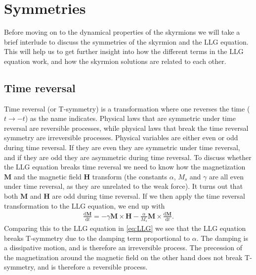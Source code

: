 \section{Symmetries}
Before moving on to the dynamical properties of the skyrmions we will take a brief interlude to discuss the symmetries of the skyrmion and the LLG equation. This will help us to get further insight into how the different terms in the LLG equation work, and how the skyrmion solutions are related to each other.
\subsection{Time reversal}
Time reversal (or T-symmetry) is a transformation where one reverses the time ($t \rightarrow -t$) as the name indicates. Physical laws that are symmetric under time reversal are reversible processes, while physical laws that break the time reversal symmetry are irreversible processes. Physical variables are either even or odd during time reversal. If they are even they are symmetric under time reversal, and if they are odd they are asymmetric during time reversal. To discuss whether the LLG equation breaks time reversal we need to know how the magnetization $\mathbold{M}$ and the magnetic field $\mathbold{H}$ transform (the constants $\alpha$, $M_s$ and $\gamma$ are all even under time reversal, as they are unrelated to the weak force). It turns out that both $\mathbold{M}$ and $\mathbold{H}$ are odd during time reversal. If we then apply the time reversal transformation to the LLG equation, we end up with
\begin{align}
\label{eq:LLG_TR}
\frac{\textrm{d}\mathbold{M}}{\textrm{d}t} = -\gamma\mathbold{M}\times\mathbold{H}-\frac{\alpha}{M_s}\mathbold{M}\times\frac{\textrm{d}\mathbold{M}}{\textrm{d}t}.
\end{align}
Comparing this to the LLG equation in \eqref{eq:LLG} we see that the LLG equation breaks T-symmetry due to the damping term proportional to $\alpha$. The damping is a dissipative motion, and is therefore an irreversible process. The precession of the magnetization around the magnetic field on the other hand does not break T-symmetry, and is therefore a reversible process.

